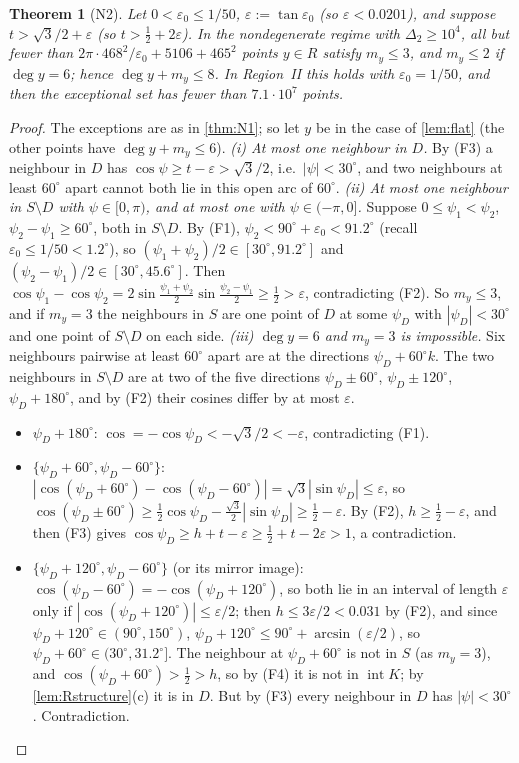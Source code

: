 \documentclass[11pt]{amsart}
\newtheorem{theorem}{Theorem}[section]
\theoremstyle{definition}
\theoremstyle{remark}
\newcommand{\Dt}{\Delta_2}
\newcommand{\eps}{\varepsilon}
\begin{document}
\begin{theorem}[N2]\label{thm:N2}
Let $0<\eps_0\le1/50$, $\eps:=\tan\eps_0$ (so $\eps<0.0201$), and suppose $t>\sqrt3/2+\eps$ (so $t>\frac12+2\eps$). In the nondegenerate regime with $\Dt\ge10^4$, all but fewer than $2\pi\cdot468^2/\eps_0+5106+465^2$ points $y\in R$ satisfy $m_y\le3$, and $m_y\le2$ if $\deg y=6$; hence $\deg y+m_y\le8$. In Region~II this holds with $\eps_0=1/50$, and then the exceptional set has fewer than $7.1\cdot10^7$ points.
\end{theorem}
\begin{proof}
The exceptions are as in \cref{thm:N1}; so let $y$ be in the case of \cref{lem:flat} (the other points have $\deg y+m_y\le6$).
\emph{(i) At most one neighbour in $D$.} By (F3) a neighbour in $D$ has $\cos\psi\ge t-\eps>\sqrt3/2$, i.e.\ $|\psi|<30^\circ$, and two neighbours at least $60^\circ$ apart cannot both lie in this open arc of $60^\circ$.
\emph{(ii) At most one neighbour in $S\setminus D$ with $\psi\in[0,\pi)$, and at most one with $\psi\in(-\pi,0]$.} Suppose $0\le\psi_1<\psi_2$, $\psi_2-\psi_1\ge60^\circ$, both in $S\setminus D$. By (F1), $\psi_2<90^\circ+\eps_0<91.2^\circ$ (recall $\eps_0\le1/50<1.2^\circ$), so $(\psi_1+\psi_2)/2\in[30^\circ,91.2^\circ]$ and $(\psi_2-\psi_1)/2\in[30^\circ,45.6^\circ]$. Then $\cos\psi_1-\cos\psi_2=2\sin\frac{\psi_1+\psi_2}2\sin\frac{\psi_2-\psi_1}2\ge\frac12>\eps$, contradicting (F2).
So $m_y\le3$, and if $m_y=3$ the neighbours in $S$ are one point of $D$ at some $\psi_D$ with $|\psi_D|<30^\circ$ and one point of $S\setminus D$ on each side.
\emph{(iii) $\deg y=6$ and $m_y=3$ is impossible.} Six neighbours pairwise at least $60^\circ$ apart are at the directions $\psi_D+60^\circ k$. The two neighbours in $S\setminus D$ are at two of the five directions $\psi_D\pm60^\circ$, $\psi_D\pm120^\circ$, $\psi_D+180^\circ$, and by (F2) their cosines differ by at most $\eps$.
\begin{itemize}[leftmargin=2em]
\item $\psi_D+180^\circ$: $\cos=-\cos\psi_D<-\sqrt3/2<-\eps$, contradicting (F1).
\item $\{\psi_D+60^\circ,\psi_D-60^\circ\}$: $|\cos(\psi_D+60^\circ)-\cos(\psi_D-60^\circ)|=\sqrt3|\sin\psi_D|\le\eps$, so $\cos(\psi_D\pm60^\circ)\ge\frac12\cos\psi_D-\frac{\sqrt3}2|\sin\psi_D|\ge\frac12-\eps$. By (F2), $h\ge\frac12-\eps$, and then (F3) gives $\cos\psi_D\ge h+t-\eps\ge\frac12+t-2\eps>1$, a contradiction.
\item $\{\psi_D+120^\circ,\psi_D-60^\circ\}$ (or its mirror image): $\cos(\psi_D-60^\circ)=-\cos(\psi_D+120^\circ)$, so both lie in an interval of length $\eps$ only if $|\cos(\psi_D+120^\circ)|\le\eps/2$; then $h\le3\eps/2<0.031$ by (F2), and since $\psi_D+120^\circ\in(90^\circ,150^\circ)$, $\psi_D+120^\circ\le90^\circ+\arcsin(\eps/2)$, so $\psi_D+60^\circ\in(30^\circ,31.2^\circ]$. The neighbour at $\psi_D+60^\circ$ is not in $S$ (as $m_y=3$), and $\cos(\psi_D+60^\circ)>\frac12>h$, so by (F4) it is not in $\operatorname{int}K$; by \cref{lem:Rstructure}(c) it is in $D$. But by (F3) every neighbour in $D$ has $|\psi|<30^\circ$. Contradiction.

\end{itemize}
\end{proof}
\end{document}

